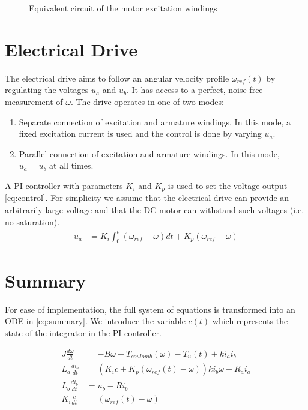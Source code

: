 \documentclass{article}
\begin{document}
\begin{figure}
  \centering
  \caption{Equivalent circuit of the motor excitation windings}
  \label{fig:excitation}
\end{figure}
\section{Electrical Drive}
The electrical drive aims to follow an angular velocity profile $\omega_{ref}(t)$ by regulating the voltages $u_a$ and $u_b$.
It has access to a perfect, noise-free measurement of $\omega$.
The drive operates in one of two modes:
\begin{enumerate}
  \item Separate connection of excitation and armature windings. In this mode, a fixed excitation current is used and the control is done by varying $u_a$.
  \item Parallel connection of excitation and armature windings. In this mode, $u_a = u_b$ at all times.
  \end{enumerate}
A PI controller with parameters $K_i$ and $K_p$ is used to set the voltage output \cref{eq:control}.
For simplicity we assume that the electrical drive can provide an arbitrarily large voltage and that the DC motor can withstand such voltages (i.e. no saturation).
\begin{align}
  u_a &= K_i \int_0^t (\omega_{ref} - \omega) dt + K_p (\omega_{ref} - \omega) \label{eq:control}
  \end{align}

\section{Summary}
For ease of implementation, the full system of equations is transformed into an ODE in \cref{eq:summary}.
We introduce the variable $c(t)$ which represents the state of the integrator in the PI controller.

\begin{subequations}
  \label{eq:summary}
\begin{align}
  J\frac{d\omega}{dt} &= -B\omega - T_{coulomb}(\omega) - T_u(t) + k i_a i_b  \\
  L_a\frac{di_a}{dt} &= \left(K_i c + K_p (\omega_{ref}(t) - \omega)\right) ki_b\omega - R_a i_a     \\
  L_b\frac{di_b}{dt} &= u_b - Ri_b  \\
  K_i \frac{c}{dt} &= (\omega_{ref}(t)-\omega)
\end{align}
\end{subequations}
\end{document}
